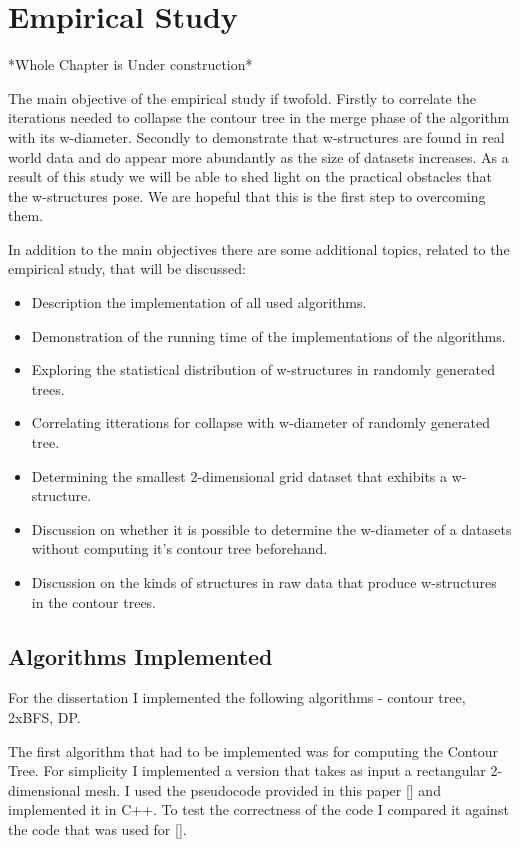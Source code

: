 \chapter{Empirical Study}
\label{chapter3}

*Whole Chapter is Under construction* 


The main objective of the empirical study if twofold. Firstly to correlate the iterations needed to collapse the contour tree in the merge phase of the algorithm with its w-diameter. Secondly to demonstrate that w-structures are found in real world data and do appear more abundantly as the size of datasets increases. As a result of this study we will be able to shed light on the practical obstacles that the w-structures pose. We are hopeful that this is the first step to overcoming them.

In addition to the main objectives there are some additional topics, related to the empirical study, that will be discussed:

\begin{itemize}
    \item Description the implementation of all used algorithms.
    \item Demonstration of the running time of the implementations of the algorithms.
    \item Exploring the statistical distribution of w-structures in randomly generated trees.
    \item Correlating itterations for collapse with w-diameter of randomly generated tree.
    \item Determining the smallest 2-dimensional grid dataset that exhibits a w-structure.
    \item Discussion on whether it is possible to determine the w-diameter of a datasets without computing it's contour tree beforehand.
    \item Discussion on the kinds of structures in raw data that produce w-structures in the contour trees.
\end{itemize}


\section{Algorithms Implemented}

For the dissertation I implemented the following algorithms - contour tree, 2xBFS, DP.

The first algorithm that had to be implemented was for computing the Contour Tree. For simplicity I implemented a version that takes as input a rectangular 2-dimensional mesh. I used the pseudocode provided in this paper [] and implemented it in C++. To test the correctness of the code I compared it against the code that was used for [].


